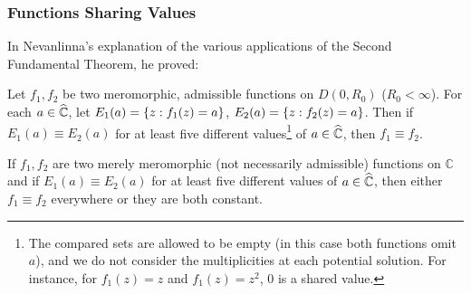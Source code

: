 \subsubsection{Functions Sharing Values}
In Nevanlinna's explanation of the various applications of the Second Fundamental Theorem, he proved:
\begin{theorem}
    Let \(f_1,f_2\) be two meromorphic, admissible functions on \(D(0,R_0)\) (\(R_0<\infty\)). For each \(a\in\widehat{\mathbb{C}}\), let \(E_1(a)=\cbraces{z}{f_1(z)=a}\), \(E_2(a)=\cbraces{z}{f_2(z)=a}\). Then if \(E_1(a)\equiv E_2(a)\) for at least five different values\footnote{The compared sets are allowed to be empty (in this case both functions omit \(a\)), and we do not consider the multiplicities at each potential solution. For instance, for \(f_1(z)=z\) and \(f_1(z)=z^2\), 0 is a shared value.} of \(a\in\widehat{\mathbb{C}}\), then \(f_1\equiv f_2\).

    If \(f_1,f_2\) are two merely meromorphic (not necessarily admissible) functions on \(\mathbb{C}\) and if \(E_1(a)\equiv E_2(a)\) for at least five different values of \(a\in\widehat{\mathbb{C}}\), then either \(f_1\equiv f_2\) everywhere or they are both constant.
\end{theorem}
